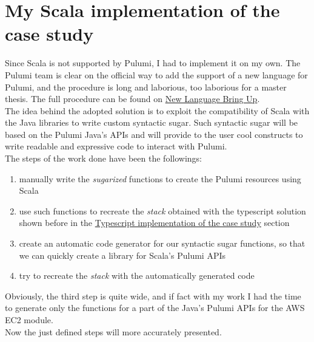 \section{My Scala implementation of the case study}
Since Scala is not supported by Pulumi, I had to implement it on my own.
The Pulumi team is clear on the official way to add the support of a new language for Pulumi, and the procedure is long and laborious, too laborious for a master thesis.
The full procedure can be found on \href{https://github.com/pulumi/pulumi/wiki/New-Language-Bring-up}{New Language Bring Up}.\\
The idea behind the adopted solution is to exploit the compatibility of Scala with the Java libraries to write custom syntactic sugar.
Such syntactic sugar will be based on the Pulumi Java's APIs and will provide to the user cool constructs to write readable and expressive code to interact with Pulumi.\\
The steps of the work done have been the followings:
\begin{enumerate}
  \item manually write the \textit{sugarized} functions to create the Pulumi resources using Scala
  \item use such functions to recreate the \textit{stack} obtained with the typescript solution shown before in the \hyperref[sec:typescript-impl]{Typescript implementation of the case study} section
  \item create an automatic code generator for our syntactic sugar functions, so that we can quickly create a library for Scala's Pulumi APIs
  \item try to recreate the \textit{stack} with the automatically generated code
\end{enumerate}
Obviously, the third step is quite wide, and if fact with my work I had the time to generate only the functions for a part of the Java's Pulumi APIs for the AWS EC2 module.\\
Now the just defined steps will more accurately presented.

